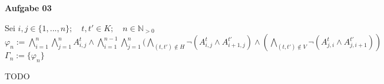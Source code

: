 \documentclass[a4paper,10pt]{article}
\begin{document}
	\textbf{Aufgabe 03}
	\begin{compactenum} [(a)]
		\item Sei $ i,j \in \{1,...,n\}; \quad t,t' \in K; \quad n \in \mathbb{N}_{>0} $\\
		$ \varphi_n := \bigwedge\limits_{i = 1}^n \bigwedge\limits_{j = 1}^n A_{i,j}^t \wedge \bigwedge\limits_{i=1}^{n-1} \bigwedge\limits_{j=1}^n (\bigwedge\limits_{(t,t') \not\in H} \lnot (A_{i,j}^t \wedge A_{i+1,j}^{t'}) \wedge (\bigwedge\limits_{(t,t') \not\in V} \lnot (A_{j,i}^t \wedge A_{j,i+1}^{t'})) $ \\
		$ \Gamma_n := \{\varphi_n\} $
		
		\item TODO
	\end{compactenum}
\end{document}
